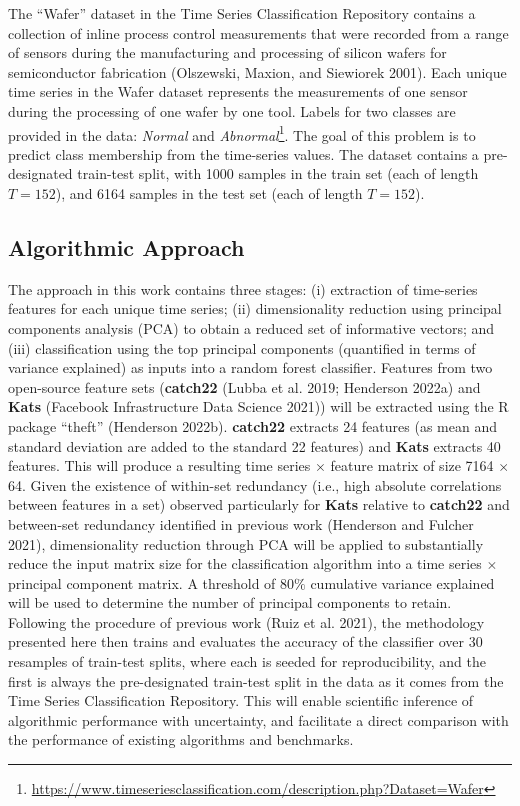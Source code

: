 \documentclass{article}
\begin{document}
The ``Wafer'' dataset in the Time Series Classification Repository contains a collection of inline process control measurements that were recorded from a range of sensors during the manufacturing and processing of silicon wafers for semiconductor fabrication (Olszewski, Maxion, and Siewiorek 2001). Each unique time series in the Wafer dataset represents the measurements of one sensor during the processing of one wafer by one tool. Labels for two classes are provided in the data: \emph{Normal} and \emph{Abnormal}\footnote{\url{https://www.timeseriesclassification.com/description.php?Dataset=Wafer}}. The goal of this problem is to predict class membership from the time-series values. The dataset contains a pre-designated train-test split, with 1000 samples in the train set (each of length \(T = 152\)), and 6164 samples in the test set (each of length \(T = 152\)).

\hypertarget{algorithmic-approach}{%
\subsection{Algorithmic Approach}\label{algorithmic-approach}}

The approach in this work contains three stages: (i) extraction of time-series features for each unique time series; (ii) dimensionality reduction using principal components analysis (PCA) to obtain a reduced set of informative vectors; and (iii) classification using the top principal components (quantified in terms of variance explained) as inputs into a random forest classifier. Features from two open-source feature sets (\textbf{catch22} (Lubba et al. 2019; Henderson 2022a) and \textbf{Kats} (Facebook Infrastructure Data Science 2021)) will be extracted using the R package ``theft'' (Henderson 2022b). \textbf{catch22} extracts 24 features (as mean and standard deviation are added to the standard 22 features) and \textbf{Kats} extracts 40 features. This will produce a resulting time series \(\times\) feature matrix of size 7164 \(\times\) 64. Given the existence of within-set redundancy (i.e., high absolute correlations between features in a set) observed particularly for \textbf{Kats} relative to \textbf{catch22} and between-set redundancy identified in previous work (Henderson and Fulcher 2021), dimensionality reduction through PCA will be applied to substantially reduce the input matrix size for the classification algorithm into a time series \(\times\) principal component matrix. A threshold of 80\(\%\) cumulative variance explained will be used to determine the number of principal components to retain. Following the procedure of previous work (Ruiz et al. 2021), the methodology presented here then trains and evaluates the accuracy of the classifier over 30 resamples of train-test splits, where each is seeded for reproducibility, and the first is always the pre-designated train-test split in the data as it comes from the Time Series Classification Repository. This will enable scientific inference of algorithmic performance with uncertainty, and facilitate a direct comparison with the performance of existing algorithms and benchmarks.
\end{document}
